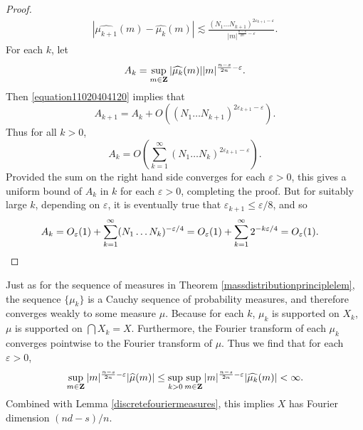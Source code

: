 \begin{proof}
    \begin{equation} \label{equation11020404120}
    \begin{split}
        |\widehat{\mu_{k+1}}(m) - \widehat{\mu_k}(m)| \lesssim \frac{(N_1 \dots N_{k+1})^{2\varepsilon_{k+1} - \varepsilon}}{|m|^{\frac{n-s}{2n} - \varepsilon}}.
    \end{split}
    \end{equation}
    For each $k$, let
    \[ A_k = \sup_{m \in \operatorname{\mathbf{Z}}} |\widehat{\mu_k}(m)| |m|^{\frac{n-s}{2n} - \varepsilon}. \]
    Then \eqref{equation11020404120} implies that
    \[ A_{k+1} = A_k + O \left( (N_1 \dots N_{k+1})^{2\varepsilon_{k+1} - \varepsilon} \right). \]
    Thus for all $k > 0$,
    \[ A_k = O \left( \sum_{k = 1}^\infty (N_1 \dots N_k)^{2\varepsilon_{k+1} - \varepsilon} \right). \]
    Provided the sum on the right hand side converges for each $\varepsilon > 0$, this gives a uniform bound of $A_k$ in $k$ for each $\varepsilon > 0$, completing the proof. But for suitably large $k$, depending on $\varepsilon$, it is eventually true that $\varepsilon_{k+1} \leq \varepsilon/8$, and so
    \begin{align*}
        A_k &= O_\varepsilon(1) + \sum_{k = 1}^\infty (N_1 \dots N_k)^{-\varepsilon/4} = O_\varepsilon(1) + \sum_{k = 1}^\infty 2^{-k\varepsilon/4} = O_\varepsilon(1). \qedhere
    \end{align*}
\end{proof}

Just as for the sequence of measures in Theorem \ref{massdistributionprinciplelem}, the sequence $\{ \mu_k \}$ is a Cauchy sequence of probability measures, and therefore converges weakly to some measure $\mu$. Because for each $k$, $\mu_k$ is supported on $X_k$, $\mu$ is supported on $\bigcap X_k = X$. Furthermore, the Fourier transform of each $\mu_k$ converges pointwise to the Fourier transform of $\mu$. Thus we find that for each $\varepsilon > 0$,
%
\[ \sup_{m \in \operatorname{\mathbf{Z}}} |m|^{\frac{n-s}{2n} - \varepsilon} |\widehat{\mu}(m)| \leq \sup_{k > 0} \sup_{m \in \operatorname{\mathbf{Z}}} |m|^{\frac{n-s}{2n} - \varepsilon} |\widehat{\mu_k}(m)| < \infty. \]
%
Combined with Lemma \ref{discretefouriermeasures}, this implies $X$ has Fourier dimension $(nd - s)/n$.

\endinput